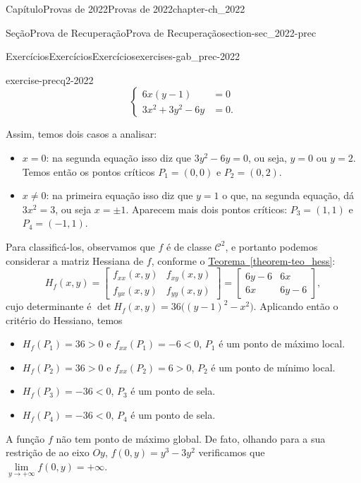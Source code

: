 \documentclass[oneside,10pt,]{book}
\newcommand{\xreffont}{\relax}
\numberwithin{equation}{section}
\newcommand{\lt}{<}
\newcommand{\gt}{>}
\newcommand{\amp}{&}
\begin{document}
\begin{chapterptx}{Capítulo}{Provas de 2022}{}{Provas de 2022}{}{}{chapter-ch_2022}
\begin{sectionptx}{Seção}{Prova de Recuperação}{}{Prova de Recuperação}{}{}{section-sec_2022-prec}
\begin{exercises-subsection-numberless}{Exercícios}{Exercícios}{}{Exercícios}{}{}{exercises-gab_prec-2022}
\begin{divisionexercise}{2}{}{}{exercise-precq2-2022}
\begin{equation*}
\begin{cases} 6x(y-1)\amp=0\\ 3x^2+3y^2-6y\amp=0.
\end{cases}
\end{equation*}
%
\par
Assim, temos dois casos a analisar:%
\begin{itemize}[label=\textbullet]
\item{}\(x=0\): na segunda equação isso diz que \(3y^2-6y=0\), ou seja, \(y=0\) ou \(y=2\). Temos então os pontos críticos \(\boxed{P_1=(0,0)}\) e \(\boxed{P_2=(0,2)}\).%
\item{}\(x\neq 0\): na primeira equação isso diz que \(y=1\) o que, na segunda equação, dá \(3x^2=3\), ou seja \(x=\pm
1\). Aparecem mais dois pontos críticos: \(\boxed{P_3=(1,1)}\) e \(\boxed{P_4=(-1,1)}\).%
\end{itemize}
%
\par
Para classificá-los, observamos que \(f\) é de classe \(\mathscr{C}^2\), e portanto podemos considerar a matriz Hessiana de \(f\), conforme o \hyperref[theorem-teo_hess]{Teorema~{\xreffont\ref{theorem-teo_hess}}}:%
\begin{equation*}
H_f(x,y)= \begin{bmatrix} f_{xx}(x,y)\amp f_{xy}(x,y)\\
f_{yx}(x,y)\amp f_{yy}(x,y) \end{bmatrix}= \begin{bmatrix}
6y-6\amp 6x\\
6x\amp 6y-6 \end{bmatrix},
\end{equation*}
cujo determinante é \(\det
H_f(x,y)=36\big((y-1)^2-x^2\big)\). Aplicando então o critério do Hessiano, temos%
\begin{itemize}[label=\textbullet]
\item{}\(H_f(P_1)=36\gt 0\) e \(f_{xx}(P_1)=-6\lt 0\), \(P_1\) é um ponto de máximo local.%
\item{}\(H_f(P_2)=36\gt 0\) e \(f_{xx}(P_2)=6\gt 0\), \(P_2\) é um ponto de mínimo local.%
\item{}\(H_f(P_3)=-36\lt 0\), \(P_3\) é um ponto de sela.%
\item{}\(H_f(P_4)=-36\lt 0\), \(P_4\) é um ponto de sela.%
\end{itemize}
%
\par
A função \(f\) não tem ponto de máximo global. De fato, olhando para a sua restrição de ao eixo \(Oy\), \(f(0,y)=y^3-3y^2\) verificamos que \(\lim\limits_{y\to+\infty}f(0,y)=+\infty\).%

\end{divisionexercise}
\end{exercises-subsection-numberless}
\end{sectionptx}
\end{chapterptx}
\end{document}
